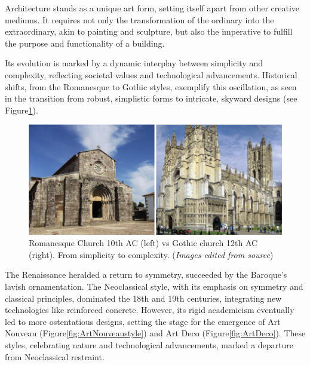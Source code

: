 


Architecture stands as a unique art form, setting itself apart from other creative mediums.
It requires not only the transformation of the ordinary into the extraordinary, akin to painting and sculpture, but also the imperative to fulfill the purpose and functionality of a building\cite{Hnin2022}.

Its evolution is marked by a dynamic interplay between simplicity and complexity, reflecting societal values and technological advancements\cite{Economakis2023}.
Historical shifts, from the Romanesque to Gothic styles, exemplify this oscillation, as seen in the transition from robust, simplistic forms to intricate, skyward designs\cite{Arora2023, Stacbond2020} (see Figure\ref{fig:RomanesquevsGothic}).

     \begin{figure}[htb]
          \centering
          \includegraphics[width= \linewidth]{Images/RomanesqueVsGothic}
          \caption{Romanesque Church 10th AC (left) vs Gothic church 12th AC (right). From simplicity to complexity. (\textit{Images edited from source})}
          \label{fig:RomanesquevsGothic}
        \end{figure}

The Renaissance heralded a return to symmetry, succeeded by the Baroque's lavish ornamentation\cite{Economakis2023}.
The Neoclassical style, with its emphasis on symmetry and classical principles, dominated the 18th and 19th centuries, integrating new technologies like reinforced concrete\cite{Economakis2023}.
However, its rigid academicism eventually led to more ostentatious designs, setting the stage for the emergence of Art Nouveau (Figure\ref{fig:ArtNouveaustyle}) and Art Deco (Figure\ref{fig:ArtDeco}).
These styles, celebrating nature and technological advancements, marked a departure from Neoclassical restraint\cite{Salas2018, Arora2023}.

